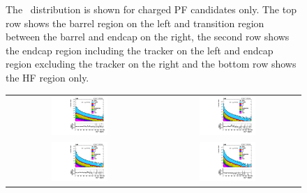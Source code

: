 \begin{figure}[!ht]
\begin{center}
\caption{The \MET\ distribution is shown for charged PF candidates only.
The top row shows the barrel region on the left and transition region between the barrel and endcap on the right,
the second row shows the endcap region including the tracker on the left and endcap region excluding the tracker on the right
and the bottom row shows the HF region only.
\label{fig:chpfcands}
}
\end{center}
\end{figure}

\begin{figure}[!ht]
  \begin{center}
    \begin{tabular}{cc}
      \includegraphics[width=0.4\textwidth]{MET/figs/h_met_phpfcands_0013_pt_ll_signalregion_inclusive_passtrig.pdf} &
      \includegraphics[width=0.4\textwidth]{MET/figs/h_met_phpfcands_1316_pt_ll_signalregion_inclusive_passtrig.pdf} \\
      \includegraphics[width=0.4\textwidth]{MET/figs/h_met_phpfcands_1624_pt_ll_signalregion_inclusive_passtrig.pdf} &
      \includegraphics[width=0.4\textwidth]{MET/figs/h_met_phpfcands_2430_pt_ll_signalregion_inclusive_passtrig.pdf} \\

\end{tabular}
\end{center}
\end{figure}
